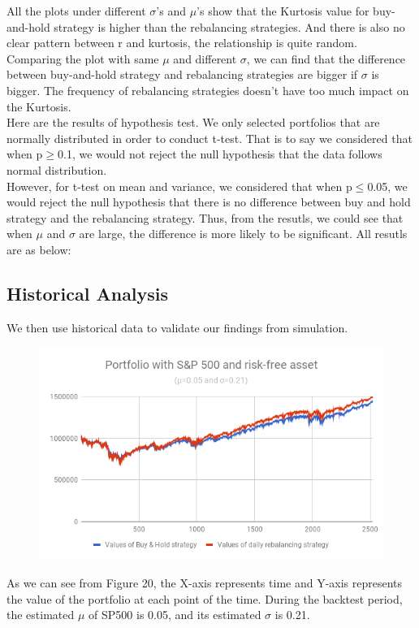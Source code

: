 \documentclass[
10pt, %
a4paper, %
oneside, %
headinclude,footinclude, %
BCOR5mm, %
]{scrartcl}
\begin{document}
All the plots under different $\sigma$’s and $\mu$’s show that the Kurtosis value for buy-and-hold strategy is higher than the rebalancing strategies. And there is also no clear pattern between r and kurtosis, the relationship is quite random.\\ 

Comparing the plot with same $\mu$ and different $\sigma$, we can find that the difference between buy-and-hold strategy and rebalancing strategies are bigger if $\sigma$ is bigger. The frequency of rebalancing strategies doesn’t have too much impact on the Kurtosis. \\

Here are the results of hypothesis test. We only selected portfolios that are normally distributed in order to conduct t-test. That is to say we considered that when p$\geq$0.1, we would not reject the null hypothesis that the data follows normal distribution.\\

However, for t-test on mean and variance, we considered that when p$\leq$0.05, we would reject the null hypothesis that there is no difference between buy and hold strategy and the rebalancing strategy. Thus, from the resutls, we could see that when $\mu$ and $\sigma$ are large, the difference is more likely to be significant. All resutls are as below: 

\subsection{Historical Analysis}
We then use historical data to validate our findings from simulation.
\begin{figure}[H]
	\centering
	\includegraphics[width=0.7\linewidth]{sp500}
	\caption{}
	\label{fig:sp500}
\end{figure}
As we can see from Figure 20, the X-axis represents time and Y-axis represents the value of the portfolio at each point of the time. During the backtest period, the estimated $\mu$ of SP500 is 0.05, and its estimated $\sigma$ is 0.21. \\
\end{document}
